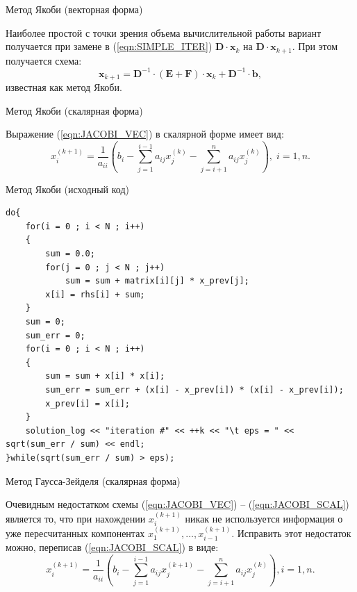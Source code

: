 \documentclass[10pt,xcolor=pst,aspectratio=169]{beamer}
\begin{document}
\begin{frame}{Метод Якоби (векторная форма)}

	\transdissolve[duration=0.2]
	\justifying
	\large
	Наиболее простой с точки зрения объема вычислительной работы вариант получается при замене в (\ref{eqn:SIMPLE_ITER}) $\textbf{D} \cdot \textbf{x}_{k}$ на $\textbf{D} \cdot \textbf{x}_{k+1}$. При этом получается схема:
	\begin{equation}
		\textbf{x}_{k+1} = \textbf{D}^{-1} \cdot (\textbf{E} + \textbf{F}) \cdot \textbf{x}_{k} + \textbf{D}^{-1} \cdot \textbf{b},
		\label{eqn:JACOBI_VEC}
	\end{equation}
	известная как метод Якоби.

\end{frame}

\begin{frame}{Метод Якоби (скалярная форма)}

	\transdissolve[duration=0.2]
	\justifying
	\large
	Выражение (\ref{eqn:JACOBI_VEC}) в скалярной форме имеет вид:
	\begin{equation}
		x_{i}^{(k+1)} = \frac{1}{a_{ii}} \left( b_{i} - \sum_{j = 1}^{i - 1} a_{ij} x_{j}^{(k)} - \sum_{j = i + 1}^{n} a_{ij} x_{j}^{(k)} \right), \; i = 1,n.
		\label{eqn:JACOBI_SCAL}
	\end{equation}

\end{frame}

\begin{frame}[fragile]{Метод Якоби (исходный код)}

	\transdissolve[duration=0.2]
	\begin{lstlisting}
do{
    for(i = 0 ; i < N ; i++)
    {
        sum = 0.0;
        for(j = 0 ; j < N ; j++)
            sum = sum + matrix[i][j] * x_prev[j];
        x[i] = rhs[i] + sum;
    }
    sum = 0;
    sum_err = 0;
    for(i = 0 ; i < N ; i++)
    {
        sum = sum + x[i] * x[i];
        sum_err = sum_err + (x[i] - x_prev[i]) * (x[i] - x_prev[i]);
        x_prev[i] = x[i];
    }
    solution_log << "iteration #" << ++k << "\t eps = " << sqrt(sum_err / sum) << endl;
}while(sqrt(sum_err / sum) > eps);
	\end{lstlisting}

\end{frame}

\begin{frame}{Метод Гаусса-Зейделя (скалярная форма)}

	\transdissolve[duration=0.2]
	\justifying
	\large
	Очевидным недостатком схемы (\ref{eqn:JACOBI_VEC}) -- (\ref{eqn:JACOBI_SCAL}) является то, что при нахождении $x_{i}^{(k+1)}$ никак не используется информация о уже пересчитанных компонентах $x_{1}^{(k+1)}, \ldots, x_{i-1}^{(k+1)}$. Исправить этот недостаток можно, переписав (\ref{eqn:JACOBI_SCAL}) в виде:
	\[
		x_{i}^{(k+1)} = \frac{1}{a_{ii}} \left( b_{i} - \sum_{j = 1}^{i - 1} a_{ij} x_{j}^{(k+1)} - \sum_{j = i + 1}^{n} a_{ij} x_{j}^{(k)} \right),  i = 1,n.
	\]

\end{frame}
\end{document}
